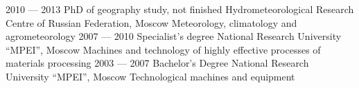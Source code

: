 \documentclass[11pt]{developercv} %
\begin{document}


\begin{entrylist}
  \entry
    {2010 --- 2013}
    {PhD of geography study, not finished}
    {Hydrometeorological Research Centre of Russian Federation, Moscow}
    {Meteorology, climatology and agrometeorology}
  \entry
    {2007 --- 2010}
    {Specialist's degree}
    {National Research University ``MPEI'', Moscow}
    {Machines and technology of highly effective processes of materials processing}
  \entry
    {2003 --- 2007}
    {Bachelor's Degree}
    {National Research University ``MPEI'', Moscow}
    {Technological machines and equipment}
\end{entrylist}
\pagebreak


\end{document}

